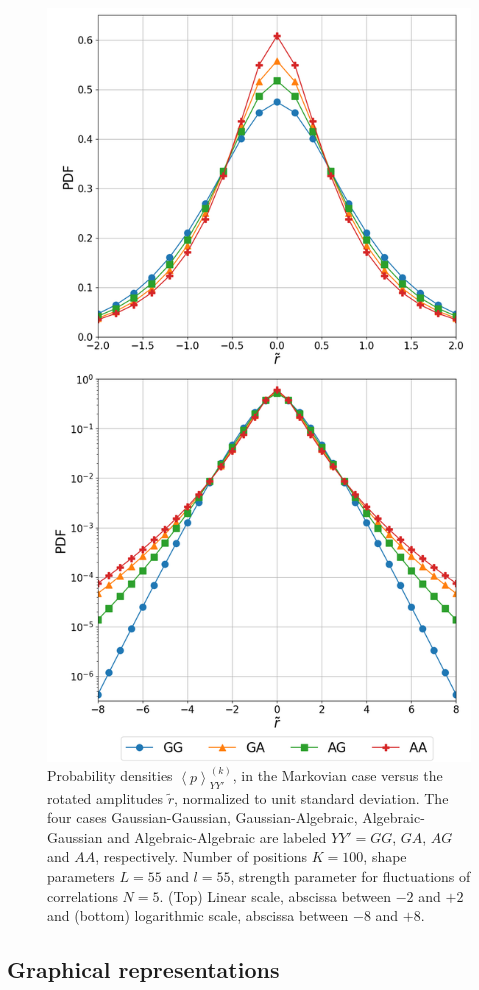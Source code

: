 \begin{figure}[htbp]
    \centering
    \includegraphics[width=0.6\columnwidth]
    {figures/07_distributions_comparison.png}
    \caption{Probability densities $\left\langle p \right\rangle_{YY'}^{\left(k\right)}$,
             in the Markovian case versus the rotated amplitudes $\tilde{r}$,
             normalized to unit standard deviation. The four cases Gaussian-Gaussian,
             Gaussian-Algebraic, Algebraic-Gaussian and Algebraic-Algebraic are
             labeled $YY' = GG$, $GA$, $AG$ and $AA$, respectively. Number of
             positions $K = 100$, shape parameters $L = 55$ and $l = 55$, strength
             parameter for fluctuations of correlations $N = 5$. (Top) Linear scale,
             abscissa between $-2$ and $+2$ and (bottom) logarithmic scale, abscissa
             between $-8$ and $+8$.}
    \label{fig:distributions_comparison}
\end{figure}

\subsection{Graphical representations}\label{subsec:graphical_distributions}

